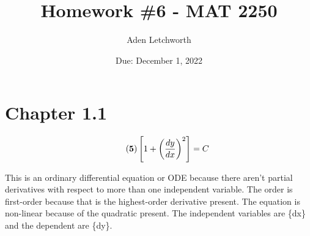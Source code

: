 \documentclass{article}
\title{Homework \#6 - MAT 2250}
\author{Aden Letchworth}
\date{Due: December 1, 2022}
\begin{document}
\maketitle

\section*{Chapter 1.1}
    \begin{gather}\tag{\textbf{5}}
    \left[1+\left(\frac{dy}{dx}\right)^2\right] = C 
    \end{gather}
    \begin{center}
        This is an ordinary differential equation or ODE because there aren't partial derivatives with respect to more than one independent variable. The order is first-order because that is the highest-order derivative present. The equation is non-linear because of the quadratic present. The independent variables are \{dx\} and the dependent are \{dy\}.
    \end{center}
\end{document}
